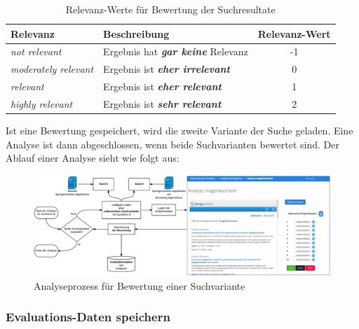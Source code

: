 \begin{table}[H]
\centering
\vspace{-.5em}
\caption[Relevanz-Werte für Bewertung der Suchresultate]{Relevanz-Werte für Bewertung der Suchresultate}
\label{tab:RelevanzWerteBewertungEvaluation}
\vspace{-.5em}
\footnotesize
\renewcommand*{\arraystretch}{1.2}
\begin{tabular}{llc}
\hline
\textbf{Relevanz}            & \textbf{Beschreibung}           & \textbf{Relevanz-Wert} \\ \hline
\textit{not relevant}        & Ergebnis hat \textbf{\textit{gar keine}} Relevanz & -1 \\
\textit{moderately relevant} & Ergebnis ist \textbf{\textit{eher irrelevant}}    & 0 \\
\textit{relevant}            & Ergebnis ist \textbf{\textit{eher relevant}}      & 1 \\
\textit{highly relevant}     & Ergebnis ist \textbf{\textit{sehr relevant}}      & 2 \\ \hline
\end{tabular}
\vspace{-2em}
\end{table}

Ist eine Bewertung gespeichert, wird die zweite Variante der Suche geladen. Eine Analyse ist dann abgeschlossen, wenn beide Suchvarianten bewertet sind. Der Ablauf einer Analyse sieht wie folgt aus:

\begin{figure}[H]
\centering
\vspace{-.5em}
\caption[Analyseprozess für Bewertung einer Suchvariante]{Analyseprozess für Bewertung einer Suchvariante}
\vspace{.5em}
\label{fig:AnalysemaskeEvaluation}
\includegraphics[width=\linewidth]{gfx/AnalysemaskeEvaluation}
\vspace{-1em}
\end{figure}

\subsubsection{Evaluations-Daten speichern}
\label{sec:Evaluation:Aufbau:Vorgehen:Speichern}

